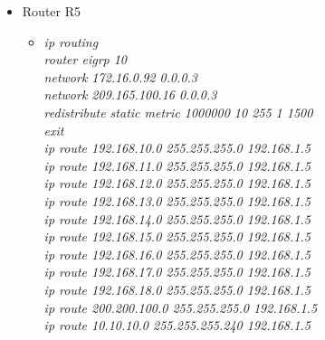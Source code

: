 \documentclass[12pt,a4paper]{report}
\begin{document}
\begin{itemize}
\begin{itemize}
\begin{itemize}
		\end{itemize}
             \item Router R5
        \begin{itemize}
         \item \textit{ip routing\\
router eigrp 10\\
network 172.16.0.92 0.0.0.3\\
network 209.165.100.16 0.0.0.3\\
redistribute static metric 1000000 10 255 1 1500\\
exit\\
ip route 192.168.10.0 255.255.255.0 192.168.1.5\\
ip route 192.168.11.0 255.255.255.0 192.168.1.5\\
ip route 192.168.12.0 255.255.255.0 192.168.1.5\\
ip route 192.168.13.0 255.255.255.0 192.168.1.5\\
ip route 192.168.14.0 255.255.255.0 192.168.1.5\\
ip route 192.168.15.0 255.255.255.0 192.168.1.5\\
ip route 192.168.16.0 255.255.255.0 192.168.1.5\\
ip route 192.168.17.0 255.255.255.0 192.168.1.5\\
ip route 192.168.18.0 255.255.255.0 192.168.1.5\\
ip route 200.200.100.0 255.255.255.0 192.168.1.5\\
ip route 10.10.10.0 255.255.255.240 192.168.1.5\\}


\end{itemize}
\end{itemize}
\end{itemize}
\end{document}
